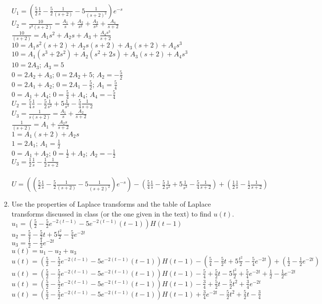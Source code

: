 \documentclass{article}
\begin{document}
\begin{enumerate}
\begin{enumerate}
\\$U_1=(\frac{5}{2}\frac{1}{s}-\frac{5}{2}\frac{1}{(s+2)}-5\frac{1}{(s+2)^2})e^{-s}$
\\$U_2=\frac{10}{s^3(s+2)}=\frac{A_1}{s}+\frac{A_2}{s^2}+\frac{A_3}{s^3}+\frac{A_4}{s+2}$
\\$\frac{10}{(s+2)}=A_1s^2+A_2s+A_3+\frac{A_4s^3}{s+2}$
\\$10=A_1s^2(s+2)+A_2s(s+2)+A_3(s+2)+A_4s^3$
\\$10=A_1(s^3+2s^2)+A_2(s^2+2s)+A_3(s+2)+A_4s^3$
\\$10=2A_3$; $A_3=5$
\\$0=2A_2+A_3$; $0=2A_2+5$; $A_2=-\frac{5}{2}$
\\$0=2A_1+A_2$; $0=2A_1-\frac{5}{2}$; $A_1=\frac{5}{4}$
\\$0=A_1+A_4$; $0=\frac{5}{4}+A_4$; $A_4=-\frac{5}{4}$
\\$U_2=\frac{5}{4}\frac{1}{s}-\frac{5}{2}\frac{1}{s^2}+5\frac{1}{s^3}-\frac{5}{4}\frac{1}{s+2}$
\\$U_3=\frac{1}{s(s+2)}=\frac{A_1}{s}+\frac{A_2}{s+2}$
\\$\frac{1}{(s+2)}=A_1+\frac{A_2s}{s+2}$
\\$1=A_1(s+2)+A_2s$
\\$1=2A_1$; $A_1=\frac{1}{2}$
\\$0=A_1+A_2$; $0=\frac{1}{2}+A_2$; $A_2=-\frac{1}{2}$
\\$U_3=\frac{1}{2}\frac{1}{s}-\frac{1}{2}\frac{1}{s+2}$
\\
\\$U=((\frac{5}{2}\frac{1}{s}-\frac{5}{2}\frac{1}{(s+2)}-5\frac{1}{(s+2)^2})e^{-s})-(\frac{5}{4}\frac{1}{s}-\frac{5}{2}\frac{1}{s^2}+5\frac{1}{s^3}-\frac{5}{4}\frac{1}{s+2})+(\frac{1}{2}\frac{1}{s}-\frac{1}{2}\frac{1}{s+2})$
\item Use the properties of Laplace transforms and the table of Laplace transforms discussed in class (or the one given in the text) to find $u(t)$.
\\$u_1=(\frac{5}{2}-\frac{5}{2}e^{-2(t-1)}-5e^{-2(t-1)}(t-1))H(t-1)$
\\$u_2=\frac{5}{4}-\frac{5}{2}t+5\frac{t^2}{2}-\frac{5}{4}e^{-2t}$
\\$u_3=\frac{1}{2}-\frac{1}{2}e^{-2t}$
\\$u(t)=u_1-u_2+u_3$
\\$u(t)=(\frac{5}{2}-\frac{5}{2}e^{-2(t-1)}-5e^{-2(t-1)}(t-1))H(t-1)-(\frac{5}{4}-\frac{5}{2}t+5\frac{t^2}{2}-\frac{5}{4}e^{-2t})+(\frac{1}{2}-\frac{1}{2}e^{-2t})$
\\$u(t)=(\frac{5}{2}-\frac{5}{2}e^{-2(t-1)}-5e^{-2(t-1)}(t-1))H(t-1)-\frac{5}{4}+\frac{5}{2}t-5\frac{t^2}{2}+\frac{5}{4}e^{-2t}+\frac{1}{2}-\frac{1}{2}e^{-2t}$
\\$u(t)=(\frac{5}{2}-\frac{5}{2}e^{-2(t-1)}-5e^{-2(t-1)}(t-1))H(t-1)-\frac{3}{4}+\frac{5}{2}t-\frac{5}{2}t^2+\frac{3}{4}e^{-2t}$
\\$u(t)=(\frac{5}{2}-\frac{5}{2}e^{-2(t-1)}-5e^{-2(t-1)}(t-1))H(t-1)+\frac{3}{4}e^{-2t}-\frac{5}{2}t^2+\frac{5}{2}t-\frac{3}{4}$
\end{enumerate}


\end{enumerate}
\end{document}
